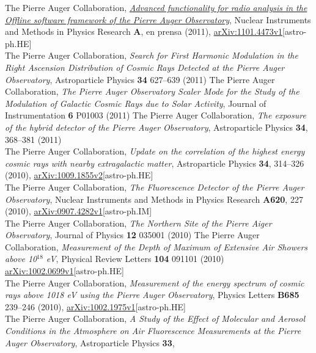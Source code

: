 \documentclass[11pt, a4paper]{article}
\newcommand{\years}[1]{\marginnote{\scriptsize #1}}
\begin{document}
\years{2011}The Pierre Auger Collaboration,
\href{http://dx.doi.org/10.1016/j.nima.2011.01.049}{{\emph{Advanced
functionality for radio analysis in the Offline software framework of the
Pierre Auger Observatory}}}, Nuclear Instruments and Methods in Physics
Research {\bf A}, en prensa (2011),
\href{http://arxiv.org/abs/1101.4473}{arXiv:1101.4473v1}[astro-ph.HE]\\
\years{2011}The Pierre Auger Collaboration, {\emph{Search for First Harmonic
Modulation in the Right Ascension Distribution of Cosmic Rays Detected at the
Pierre Auger Observatory}}, Astroparticle Physics {\bf 34} 627--639 (2011)
\years{2011}The Pierre Auger Collaboration, {\emph{The Pierre Auger Observatory
Scaler Mode for the Study of the Modulation of Galactic Cosmic Rays due to
Solar Activity}}, Journal of Instrumentation {\bf 6} P01003 (2011)
\years{2010}The Pierre Auger Collaboration, {\emph{The exposure of the hybrid
detector of the Pierre Auger Observatory}}, Astroparticle Physics {\bf 34},
368--381 (2011)\\
\years{2010}The Pierre Auger Collaboration, {\emph{Update on the correlation of
the highest energy cosmic rays with nearby extragalactic matter}},
Astroparticle Physics {\bf 34}, 314--326 (2010),
\href{http://arxiv.org/abs/1009.1855}{arXiv:1009.1855v2}[astro-ph.HE]\\
\years{2010}The Pierre Auger Collaboration, {\emph{The Fluorescence Detector of
the Pierre Auger Observatory}}, Nuclear Instruments and Methods in Physics
Research {\bf A620}, 227 (2010),
\href{http://arxiv.org/abs/0907.4282}{arXiv:0907.4282v1}[astro-ph.IM]\\
\years{2010}The Pierre Auger Collaboration, {\emph{The Northern Site of the
Pierre Aiger Observatory}}, Journal of Physics {\bf 12} 035001 (2010)
\years{2010}The Pierre Auger Collaboration, {\emph{Measurement of the Depth of
Maximum of Extensive Air Showers above 10$^{18}$ eV}}, Physical Review Letters
{\bf 104} 091101 (2010)
\href{http://arxiv.org/abs/1002.0699}{arXiv:1002.0699v1}[astro-ph.HE]\\
\years{2010}The Pierre Auger Collaboration, {\emph{Measurement of the energy
spectrum of cosmic rays above 1018 eV using the Pierre Auger Observatory}},
Physics Letters {\bf B685} 239--246 (2010),
\href{http://arxiv.org/abs/1002.1975}{arXiv:1002.1975v1}[astro-ph.HE]\\
\years{2010}The Pierre Auger Collaboration, {\emph{A Study of the Effect of
Molecular and Aerosol Conditions in the Atmosphere on Air Fluorescence
Measurements at the Pierre Auger Observatory}}, Astroparticle Physics {\bf 33},
\end{document}
